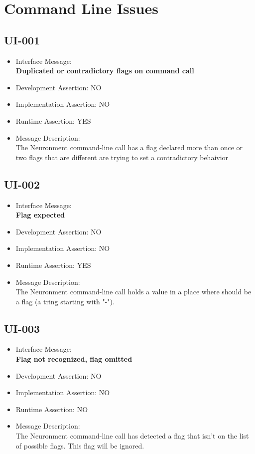 \section{Command Line Issues}

\subsection{UI-001}
\begin{itemize}
  \item Interface Message:\\[1em]\textbf{Duplicated or contradictory flags on command call}
  \item Development Assertion: NO
  \item Implementation Assertion: NO
  \item Runtime Assertion: YES
  \item Message Description:\\[1em]The Neuronment command-line call has a flag declared more than once or two flags that are different are trying to set a contradictory behaivior
\end{itemize}

\subsection{UI-002}
\begin{itemize}
  \item Interface Message:\\[1em]\textbf{Flag expected}
  \item Development Assertion: NO
  \item Implementation Assertion: NO
  \item Runtime Assertion: YES
  \item Message Description:\\[1em]The Neuronment command-line call holds a value in a place where should be a flag (a tring starting with "-").
\end{itemize}

\subsection{UI-003}
\begin{itemize}
  \item Interface Message:\\[1em]\textbf{Flag not recognized, flag omitted}
  \item Development Assertion: NO
  \item Implementation Assertion: NO
  \item Runtime Assertion: NO
  \item Message Description:\\[1em]The Neuronment command-line call has detected a flag that isn't on the list of possible flags. This flag will be ignored.
\end{itemize}

